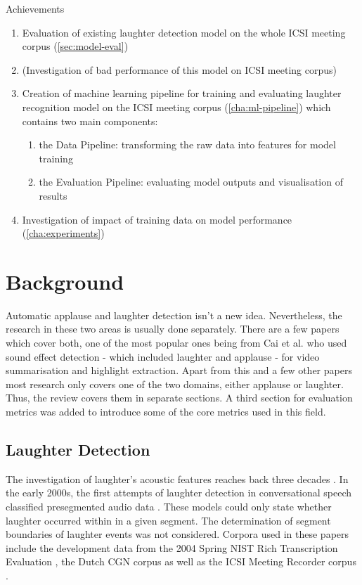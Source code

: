 \documentclass[bsc,frontabs,parskip,deptreport]{infthesis}
\begin{document}
Achievements
\begin{enumerate}
  \item Evaluation of existing laughter detection model on the whole ICSI meeting corpus (\autoref{sec:model-eval})
  \item (Investigation of bad performance of this model on ICSI meeting corpus)
  \item Creation of machine learning pipeline for training and evaluating laughter recognition model on the ICSI meeting corpus (\autoref{cha:ml-pipeline}) which contains two main components:
  \begin{enumerate}
      \item the Data Pipeline: transforming the raw data into features for model training
      \item the Evaluation Pipeline: evaluating model outputs and visualisation of results
  \end{enumerate}
  \item Investigation of impact of training data on model performance (\autoref{cha:experiments})
\end{enumerate}

\chapter{Background} \label{cha:bg}
Automatic applause and laughter detection isn't a new idea. Nevertheless, the research in these two areas is usually done separately. There are a few papers which cover both, one of the most popular ones being from Cai et al. \citep{cai2003highlight} who used sound effect detection - which included laughter and applause - for video summarisation and highlight extraction.
Apart from this and a few other papers most research only covers one of the two domains, either applause or laughter. Thus, the review covers them in separate sections. A third section for evaluation metrics was added to introduce some of the core metrics used in this field. 

\section{Laughter Detection} \label{sec:bg-laughter}
The investigation of laughter's acoustic features reaches back three decades \citep{bickley1992acoustic}.
In the early 2000s, the first attempts of laughter detection in conversational speech classified presegmented audio data \citep{kennedy2004laughter, truong2005automatic}. These models could only state whether laughter occurred within in a given segment. The determination of segment boundaries of laughter events was not considered. 
Corpora used in these papers include the development data from the 2004 Spring NIST Rich Transcription Evaluation \citep{ldcnistcorpus}, the Dutch CGN corpus \citep{oostdijk2000spoken} as well as the ICSI Meeting Recorder corpus \citep{morgan2001meeting}. 
\end{document}

